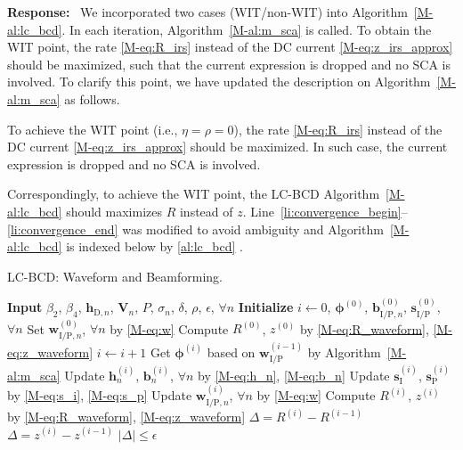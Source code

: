 \documentclass{article}
\newcounter{reviewer}
\newcounter{point}[reviewer]
\newcounter{response}[reviewer]
\newenvironment{response}
	{\refstepcounter{response} \medskip \noindent \textbf{Response:}\ }
	{\medskip}
\begin{document}
\begin{reviewer}
		\begin{response}
			We incorporated two cases (WIT/non-WIT) into Algorithm~\ref{M-al:lc_bcd}. In each iteration, Algorithm~\ref{M-al:m_sca} is called. To obtain the WIT point, the rate \eqref{M-eq:R_irs} instead of the DC current \eqref{M-eq:z_irs_approx} should be maximized, such that the current expression is dropped and no SCA is involved. To clarify this point, we have updated the description on Algorithm~\ref{M-al:m_sca} as follows.
			\begin{framed}
				To achieve the WIT point (i.e., $\eta=\rho=0$), the rate \eqref{M-eq:R_irs} instead of the DC current \eqref{M-eq:z_irs_approx} should be maximized. In such case, the current expression is dropped and no SCA is involved.
			\end{framed}
			Correspondingly, to achieve the WIT point, the LC-BCD Algorithm~\ref{M-al:lc_bcd} should maximizes $R$ instead of $z$. Line~\ref{li:convergence_begin}--\ref{li:convergence_end} was modified to avoid ambiguity and Algorithm~\ref{M-al:lc_bcd} is indexed below by \ref{al:lc_bcd} .
			\begin{algorithm}[!h]
				\caption{LC-BCD: Waveform and Beamforming.}
				\label{al:lc_bcd}
				\begin{algorithmic}[1]
					\State \textbf{Input} $\beta_2$, $\beta_4$, $\boldsymbol{h}_{\mathrm{D},n}$, $\boldsymbol{V}_{n}$, $P$, $\sigma_n$, $\delta$, $\rho$, $\epsilon$, $\forall n$
					\State \textbf{Initialize} $i \gets 0$, $\boldsymbol{\phi}^{(0)}$, $\boldsymbol{b}_{\mathrm{I/P},n}^{(0)}$, $\boldsymbol{s}_{\mathrm{I/P}}^{(0)}$, $\forall n$
					\State Set $\boldsymbol{w}_{\mathrm{I/P},n}^{(0)}$, $\forall n$ by \eqref{M-eq:w}
					\State Compute $R^{(0)}$, $z^{(0)}$ by \eqref{M-eq:R_waveform}, \eqref{M-eq:z_waveform}
					\Repeat
						\State $i \gets i + 1$
						\State Get $\boldsymbol{\phi}^{(i)}$ based on $\boldsymbol{w}_{\mathrm{I/P}}^{(i-1)}$ by Algorithm~\ref{M-al:m_sca}
						\State Update $\boldsymbol{h}_n^{(i)}$, $\boldsymbol{b}_n^{(i)}$, $\forall n$ by \eqref{M-eq:h_n}, \eqref{M-eq:b_n}
						\State Update $\boldsymbol{s}_{\mathrm{I}}^{(i)}$, $\boldsymbol{s}_{\mathrm{P}}^{(i)}$ by \eqref{M-eq:s_i}, \eqref{M-eq:s_p}
						\State Update $\boldsymbol{w}_{\mathrm{I/P},n}^{(i)}$, $\forall n$ by \eqref{M-eq:w}
						\State Compute $R^{(i)}$, $z^{(i)}$ by \eqref{M-eq:R_waveform}, \eqref{M-eq:z_waveform}
						 \label{li:convergence_begin}
							\State $\Delta = R^{(i)} - R^{(i-1)}$
						\Else
							\State $\Delta = z^{(i)} - z^{(i-1)}$
						\EndIf
					\Until $\lvert \Delta \rvert \le \epsilon$ \label{li:convergence_end}

\end{algorithmic}
\end{algorithm}
\end{response}
\end{reviewer}
\end{document}
